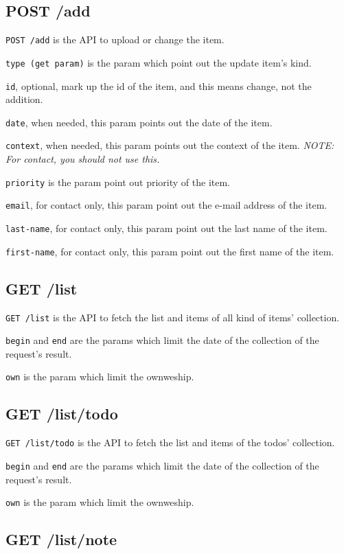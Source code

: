 \documentclass{article}
\begin{document}
  \subsection{POST /add}

  \verb|POST /add| is the API to upload or change the item.

  \verb|type (get param)| is the param which point out the update item's kind.

  \verb|id|, optional, mark up the id of the item, and this means change, not the addition.

  \verb|date|, when needed, this param points out the date of the item.

  \verb|context|, when needed, this param points out the context of the item. \textit{NOTE: For contact, you should not use this.}

  \verb|priority| is the param point out priority of the item.

  \verb|email|, for contact only, this param point out the e-mail address of the item.

  \verb|last-name|, for contact only, this param point out the last name of the item.

  \verb|first-name|, for contact only, this param point out the first name of the item.

  \subsection{GET /list}
  
  \verb|GET /list| is the API to fetch the list and items of all kind of items' collection.
  
  \verb|begin| and \verb|end| are the params which limit the date of the collection of the request's result.
  
  \verb|own| is the param which limit the ownweship.

  \subsection{GET /list/todo}

  \verb|GET /list/todo| is the API to fetch the list and items of the todos' collection.

  \verb|begin| and \verb|end| are the params which limit the date of the collection of the request's result.

  \verb|own| is the param which limit the ownweship.


  \subsection{GET /list/note}
\end{document}
